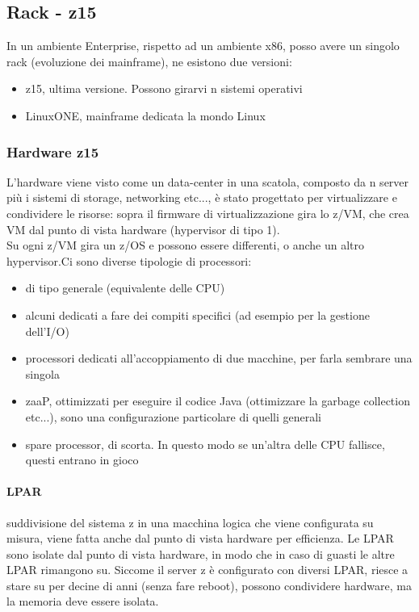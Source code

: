\documentclass{article}
\begin{document}
\subsection{Rack - z15}
In un ambiente Enterprise, rispetto ad un ambiente x86, posso avere un singolo rack (evoluzione dei mainframe), ne esistono due versioni:
\begin{itemize}
\item z15, ultima versione. Possono girarvi n sistemi operativi
\item LinuxONE, mainframe dedicata la mondo Linux
\end{itemize}
\subsubsection{Hardware z15}
L'hardware viene visto come un data-center in una scatola, composto da n server più i sistemi di storage, networking etc..., è stato progettato per virtualizzare e condividere le risorse: sopra il firmware di virtualizzazione gira lo z/VM, che crea VM dal punto di vista hardware (hypervisor di tipo 1).\\ Su ogni z/VM gira un z/OS e possono essere differenti, o anche un altro hypervisor.Ci sono diverse tipologie di processori:
\begin{itemize}
\item di tipo generale (equivalente delle CPU)
\item alcuni dedicati a fare dei compiti specifici (ad esempio per la gestione dell'I/O)
\item processori dedicati all'accoppiamento di due macchine, per farla sembrare una singola
\item zaaP, ottimizzati per eseguire il codice Java (ottimizzare la garbage collection etc...), sono una configurazione particolare di quelli generali
\item spare processor, di scorta. In questo modo se un'altra delle CPU fallisce, questi entrano in gioco
\end{itemize}
\paragraph{LPAR}suddivisione del sistema z in una macchina logica che viene configurata su misura, viene fatta anche dal punto di vista hardware per efficienza. Le LPAR sono isolate dal punto di vista hardware, in modo che in caso di guasti le altre LPAR rimangono su. Siccome il server z è configurato con diversi LPAR, riesce a stare su per decine di anni (senza fare reboot), possono condividere hardware, ma la memoria deve essere isolata.\\
\end{document}

